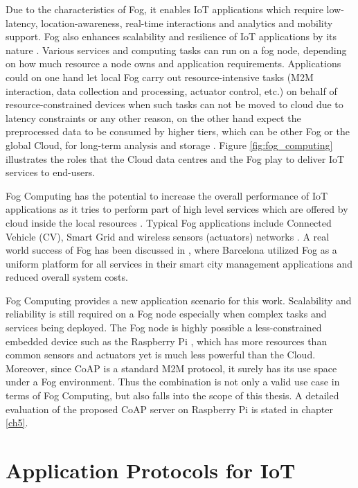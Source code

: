 Due to the characteristics of Fog, it enables IoT applications which require low-latency, location-awareness, real-time interactions and analytics and mobility support. Fog also enhances scalability and resilience of IoT applications by its nature \cite{7123563}. Various services and computing tasks can run on a fog node, depending on how much resource a node owns and application requirements. Applications could on one hand let local Fog carry out resource-intensive tasks (M2M interaction, data collection and processing, actuator control, etc.) on behalf of resource-constrained devices when such tasks can not be moved to cloud due to latency constraints or any other reason, on the other hand expect the preprocessed data to be consumed by higher tiers, which can be other Fog or the global Cloud, for long-term analysis and storage \cite{Bonomi:2012:FCR:2342509.2342513}\cite{7498684}. Figure \ref{fig:fog_computing} illustrates the roles that the Cloud data centres and the Fog play to deliver IoT services to end-users. 

Fog Computing has the potential to increase the overall performance of IoT applications as it tries to perform part of high level services which are offered by cloud inside the local resources \cite{7123563}. Typical Fog applications include Connected Vehicle (CV), Smart Grid and wireless sensors (actuators) networks \cite{Bonomi:2012:FCR:2342509.2342513}. A real world success of Fog has been discussed in \cite{7498684}, where Barcelona utilized Fog as a uniform platform for all services in their smart city management applications and reduced overall system costs.

Fog Computing provides a new application scenario for this work. Scalability and reliability is still required on a Fog node especially when complex tasks and services being deployed. The Fog node is highly possible a less-constrained embedded device such as the Raspberry Pi \cite{raspberry_pi}, which has more resources than common sensors and actuators yet is much less powerful than the Cloud. Moreover,  since CoAP is a standard M2M protocol, it surely has its use space under a Fog environment. Thus the combination is not only a valid use case in terms of Fog Computing, but also falls into the scope of this thesis. A detailed evaluation of the proposed CoAP server on Raspberry Pi is stated in chapter \ref{ch5}.

\section{Application Protocols for IoT} \label{IoT_protocols}

